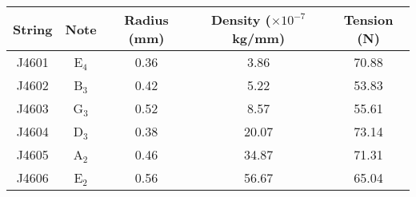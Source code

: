 \begin{tabular}{ccccc}
\toprule
String &     Note &  Radius (mm) &  Density ($\times 10^{-7}$ kg/mm) &  Tension (N) \\
\midrule
 J4601 &  E$_{4}$ &         0.36 &                              3.86 &        70.88 \\
 J4602 &  B$_{3}$ &         0.42 &                              5.22 &        53.83 \\
 J4603 &  G$_{3}$ &         0.52 &                              8.57 &        55.61 \\
 J4604 &  D$_{3}$ &         0.38 &                             20.07 &        73.14 \\
 J4605 &  A$_{2}$ &         0.46 &                             34.87 &        71.31 \\
 J4606 &  E$_{2}$ &         0.56 &                             56.67 &        65.04 \\
\bottomrule
\end{tabular}

